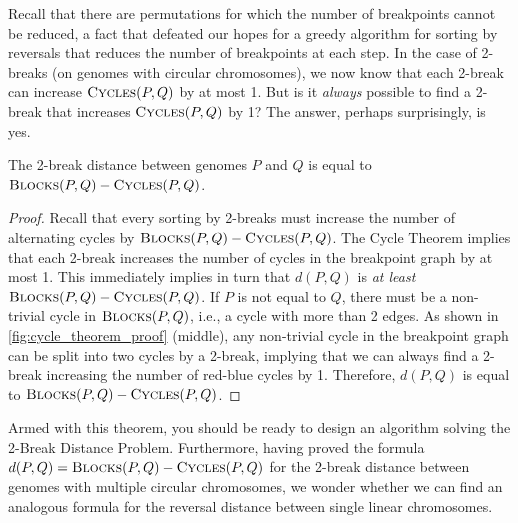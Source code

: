 Recall that there are permutations for which the number of breakpoints cannot be reduced, a fact that defeated our hopes for a greedy algorithm for sorting by reversals that reduces the number of breakpoints at each step. In the case of 2-breaks (on genomes with circular chromosomes), we now know that each 2-break can increase $\text{\scshape Cycles}(P, Q)$ by at most 1. But is it \emph{always} possible to find a 2-break that increases $\text{\scshape Cycles}(P, Q)$ by 1? The answer, perhaps surprisingly, is yes.

\begin{namedtheorem}
The 2-break distance between genomes $P$ and $Q$ is equal to $\text{\scshape Blocks}(P, Q) - \text{\scshape Cycles}(P, Q)$.
\end{namedtheorem}

\begin{proof}
Recall that every sorting by 2-breaks must increase the number of alternating cycles by $\text{\scshape Blocks}(P, Q) - \text{\scshape Cycles}(P, Q)$. The Cycle Theorem implies that each 2-break increases the number of cycles in the breakpoint graph by at most 1.  This immediately implies in turn that $d(P, Q)$ is \emph{at least} $\text{\scshape Blocks}(P, Q) - \text{\scshape Cycles}(P, Q)$. If $P$ is not equal to $Q$, there must be a non-trivial cycle in $\text{\scshape Blocks}(P, Q)$, i.e., a cycle with more than 2 edges. As shown in \autoref{fig:cycle_theorem_proof} (middle), any non-trivial cycle in the breakpoint graph can be split into two cycles by a 2-break, implying that we can always find a 2-break increasing the number of red-blue cycles by 1. Therefore, $d(P,Q)$ is equal to $\text{\scshape Blocks}(P, Q) - \text{\scshape Cycles}(P, Q)$.
\end{proof}

\protect{}
Armed with this theorem, you should be ready to design an algorithm solving the 2-Break Distance Problem. Furthermore, having proved the formula $d(P,Q) = \text{\scshape Blocks}(P, Q) - \text{\scshape Cycles}(P, Q)$ for the 2-break distance between genomes with multiple circular chromosomes, we wonder whether we can find an analogous formula for the reversal distance between single linear chromosomes.\par

\vspace{\baselineskip}

\begin{qbox}\end{qbox}

